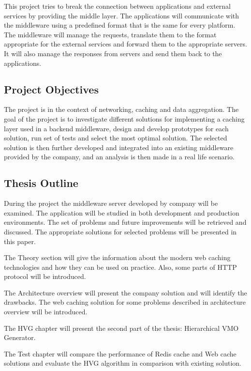 This project tries to break the connection between applications and external services by providing the middle layer. The applications will communicate with the middleware using a predefined format that is the same for every platform. The middleware will manage the requests, translate them to the format appropriate for the external services and forward them to the appropriate servers. It will also manage the responses from servers and send them back to the applications.


\subsection{Project Objectives}

The project is in the context of networking, caching and data aggregation. The goal of the project is to investigate different solutions for implementing a caching layer used in a backend middleware, design and develop prototypes for each solution, run set of tests and select the most optimal solution.
The selected solution is then further developed and integrated into an existing middleware provided by the company, and an analysis is then made in a real life scenario.


\subsection{Thesis Outline}

During the project the middleware server developed by company will be examined. The application will be studied in both development and production environments. The set of problems and future improvements will be retrieved and discussed. The appropriate solutions for selected problems will be presented in this paper.

The Theory section will give the information about the modern web caching technologies and how they can be used on practice. Also, some parts of HTTP protocol will be introduced.

The Architecture overview will present the company solution and will identify the drawbacks. The web caching solution for some problems described in architecture overview will be introduced.

The HVG chapter will present the second part of the thesis: Hierarchical VMO Generator.

The Test chapter will compare the performance of Redis cache and Web cache solutions and evaluate the HVG algorithm in comparison with existing solution.

\newpage
